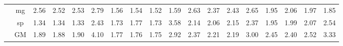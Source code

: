 \begin{table}[]
\begin{center}
{\begin{tabular}{|c|c|rrrr|rrrr|rrrr|rrrr|}
 &  mg  &  2.56  & \cellcolor{blue!25} 2.52  &  2.53  &   2.79  &  1.56  & \cellcolor{blue!25} 1.54  & \cellcolor{blue!25} 1.52  &  1.59  &  2.63  & \cellcolor{blue!25} 2.37  &  2.43  &  2.65  &  1.95  &  2.06  & \cellcolor{blue!25} 1.97  &  1.85 \\
 &  sp  &  1.34  &  1.34  & \cellcolor{blue!25} 1.33  &   2.43  &  1.73  &  1.77  & \cellcolor{blue!25} 1.73  &  3.58  &  2.14  & \cellcolor{blue!25} 2.06  &  2.15  &  2.37  &  1.95  &  1.99  &  2.07  &  2.54 \\
 &  GM  &  1.89  & \cellcolor{blue!25} 1.88  &  1.90  &   4.10  &  1.77  & \cellcolor{blue!25} 1.76  & \cellcolor{blue!25} 1.75  &  2.92  &  2.37  & \cellcolor{blue!25} 2.21  & \cellcolor{blue!25} 2.19  &  3.00  &  2.45  & \cellcolor{blue!25} 2.40  &  2.52  &  3.33 \\
\hline
\end{tabular} }

\end{center}
\end{table}
